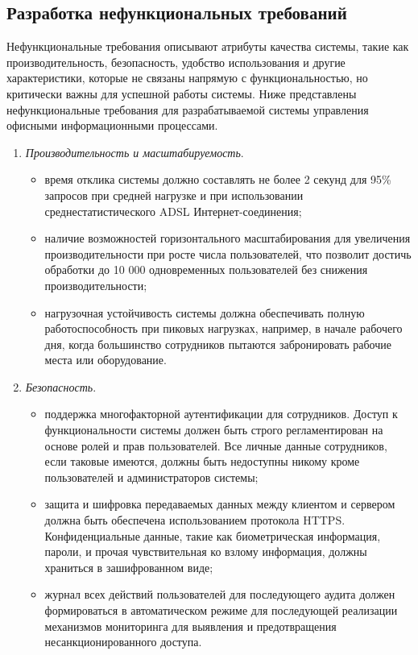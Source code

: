 \subsection{Разработка нефункциональных требований}

Нефункциональные требования описывают атрибуты качества системы, такие как производительность, безопасность, удобство использования и другие характеристики, которые не связаны напрямую с функциональностью, но критически важны для успешной работы системы. Ниже представлены нефункциональные требования для разрабатываемой системы управления офисными информационными процессами.

\begin{enumerate}
    \item \textit{Производительность и масштабируемость}.
        \begin{itemize}
            \item время отклика системы должно составлять не более 2 секунд для 95\% запросов при средней нагрузке и при использовании среднестатистического ADSL Интернет-соединения;
            \item наличие возможностей горизонтального масштабирования для увеличения производительности при росте числа пользователей, что позволит достичь обработки до 10 000 одновременных пользователей без снижения производительности;
            \item нагрузочная устойчивость системы должна обеспечивать полную работоспособность при пиковых нагрузках, например, в начале рабочего дня, когда большинство сотрудников пытаются забронировать рабочие места или оборудование.
        \end{itemize}

    \item \textit{Безопасность}.
        \begin{itemize}
            \item поддержка многофакторной аутентификации для сотрудников. Доступ к функциональности системы должен быть строго регламентирован на основе ролей и прав пользователей. Все личные данные сотрудников, если таковые имеются, должны быть недоступны никому кроме пользователей и администраторов системы;
            \item защита и шифровка передаваемых данных между клиентом и сервером должна быть обеспечена использованием протокола HTTPS. Конфиденциальные данные, такие как биометрическая информация, пароли, и прочая чувствительная ко взлому информация, должны храниться в зашифрованном виде;
            \item журнал всех действий пользователей для последующего аудита должен формироваться в автоматическом режиме для последующей реализации механизмов мониторинга для выявления и предотвращения несанкционированного доступа.
        \end{itemize}


\end{enumerate}
